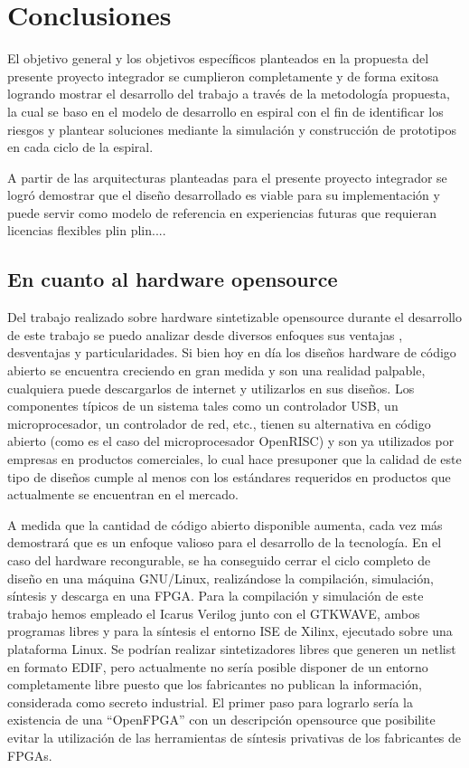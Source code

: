  \chapter{Conclusiones}

El objetivo general y los objetivos específicos planteados en la propuesta del presente proyecto integrador se cumplieron completamente y de forma exitosa logrando mostrar el desarrollo del trabajo a través de la metodología propuesta, la cual se baso en el modelo de desarrollo en espiral con el fin de identificar los riesgos y plantear soluciones mediante la simulación y construcción de prototipos en cada ciclo de la espiral.

A partir de las arquitecturas planteadas para el presente proyecto integrador se logró demostrar que el diseño desarrollado es viable para su implementación y puede servir como modelo de referencia en experiencias futuras que requieran licencias flexibles plin plin....
	 

	\section{En cuanto al hardware opensource} 

Del trabajo realizado sobre hardware sintetizable opensource durante el desarrollo de este trabajo se puedo analizar desde diversos enfoques sus
ventajas , desventajas y particularidades. Si bien hoy en día los diseños hardware de código abierto se encuentra creciendo en gran medida y son una
realidad palpable, cualquiera puede descargarlos de internet y utilizarlos en sus diseños. Los componentes típicos de un sistema tales como un
controlador USB, un microprocesador, un controlador de red, etc., tienen su alternativa en código abierto (como es el caso del microprocesador
OpenRISC) y son ya utilizados por empresas en productos comerciales, lo cual hace presuponer que la calidad de este tipo de diseños cumple al menos
con los estándares requeridos en productos que actualmente se encuentran en el mercado.

A medida que la cantidad de código abierto disponible aumenta, cada vez más demostrará que es un enfoque valioso para el desarrollo de la tecnología.
En el caso del hardware recongurable, se ha conseguido cerrar el ciclo completo de diseño en una máquina GNU/Linux, realizándose la compilación,
simulación, síntesis y descarga en una FPGA. Para la compilación y simulación de este trabajo hemos empleado el Icarus Verilog junto con el GTKWAVE,
ambos programas libres y para la síntesis el entorno ISE de Xilinx, ejecutado sobre una plataforma Linux. Se podrían realizar sintetizadores libres
que generen un netlist en formato EDIF, pero actualmente no sería posible disponer de un entorno completamente libre puesto que los fabricantes no
publican la información, considerada como secreto industrial. El primer paso para lograrlo sería la existencia de una ``OpenFPGA'' con un descripción
opensource que posibilite evitar la utilización de las herramientas de síntesis privativas de los fabricantes de FPGAs.

